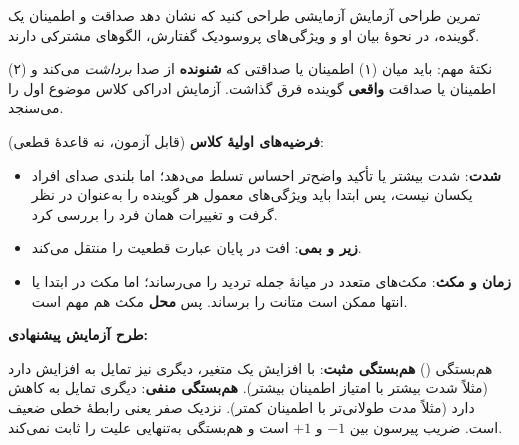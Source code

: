 \begin{assignmentbox}{تمرین طراحی آزمایش}
آزمایشی طراحی کنید که نشان دهد صداقت و اطمینان یک گوینده، در نحوهٔ بیان او و ویژگی‌های پروسودیک گفتارش، الگوهای مشترکی دارند.
\end{assignmentbox}

نکتهٔ مهم: باید میان (۱) اطمینان یا صداقتی که \textbf{شنونده} از صدا \emph{برداشت} می‌کند و (۲) اطمینان یا صداقت \textbf{واقعی} گوینده فرق گذاشت. آزمایش ادراکی کلاس موضوع اول را می‌سنجد.

\textbf{فرضیه‌های اولیهٔ کلاس} (قابل آزمون، نه قاعدهٔ قطعی):
\begin{itemize}
  \item \textbf{شدت}: شدت بیشتر یا تأکید واضح‌تر احساس تسلط می‌دهد؛ اما بلندی صدای افراد یکسان نیست، پس ابتدا باید ویژگی‌های معمول هر گوینده را به‌عنوان  در نظر گرفت و تغییرات همان فرد را بررسی کرد.
  \item \textbf{زیر و بمی}: افت  در پایان عبارت قطعیت را منتقل می‌کند.
  \item \textbf{زمان و مکث}: مکث‌های متعدد در میانهٔ جمله تردید را می‌رساند؛ اما مکث در ابتدا یا انتها ممکن است متانت را برساند. پس \textbf{محل} مکث هم مهم است.
\end{itemize}

\textbf{طرح آزمایش پیشنهادی:}
\begin{center}
\end{center}

\begin{definitionbox}{هم‌بستگی ()}
\textbf{هم‌بستگی مثبت}: با افزایش یک متغیر، دیگری نیز تمایل به افزایش دارد (مثلاً شدت بیشتر با امتیاز اطمینان بیشتر). \textbf{هم‌بستگی منفی}: دیگری تمایل به کاهش دارد (مثلاً مدت طولانی‌تر با اطمینان کمتر). نزدیک صفر یعنی رابطهٔ خطی ضعیف است. ضریب پیرسون بین $-1$ و $+1$ است و هم‌بستگی به‌تنهایی علیت را ثابت نمی‌کند.
\end{definitionbox}

